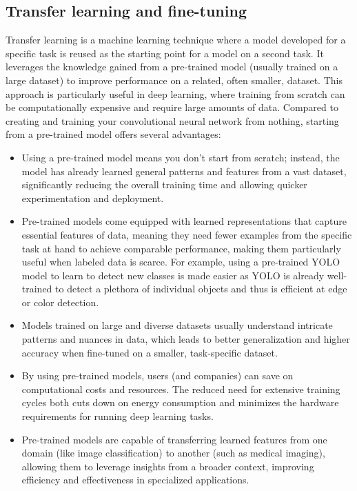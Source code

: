 \documentclass[12pt]{article}
\begin{document}
\subsection{Transfer learning and fine-tuning}

Transfer learning is a machine learning technique where a model developed for a specific task is reused as the starting point for a model on a second task. It leverages the knowledge gained from a pre-trained model (usually trained on a large dataset) to improve performance on a related, often smaller, dataset. This approach is particularly useful in deep learning, where training from scratch can be computationally expensive and require large amounts of data.
Compared to creating and training your convolutional neural network from nothing, starting from a pre-trained model offers several advantages:
\begin{itemize}
  \item Using a pre-trained model means you don’t start from scratch; instead, the model has already learned general patterns and features from a vast dataset, significantly reducing the overall training time and allowing quicker experimentation and deployment. 
  \item Pre-trained models come equipped with learned representations that capture essential features of data, meaning they need fewer examples from the specific task at hand to achieve comparable performance, making them particularly useful when labeled data is scarce. For example, using a pre-trained YOLO model to learn to detect new classes is made easier as YOLO is already well-trained to detect a plethora of individual objects and thus is efficient at edge or color detection.
  \item Models trained on large and diverse datasets usually understand intricate patterns and nuances in data, which leads to better generalization and higher accuracy when fine-tuned on a smaller, task-specific dataset.
  \item  By using pre-trained models, users (and companies) can save on computational costs and resources. The reduced need for extensive training cycles both cuts down on energy consumption and minimizes the hardware requirements for running deep learning tasks.
  \item Pre-trained models are capable of transferring learned features from one domain (like image classification) to another (such as medical imaging), allowing them to leverage insights from a broader context, improving efficiency and effectiveness in specialized applications. 
\end{itemize}
\end{document}
